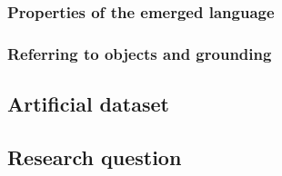 
\subsubsection{Properties of the emerged language}
\label{sec:properties-el}


\subsubsection{Referring to objects and grounding}
\label{sec:referring}

\subsection{Artificial dataset}

\subsection{Research question}

